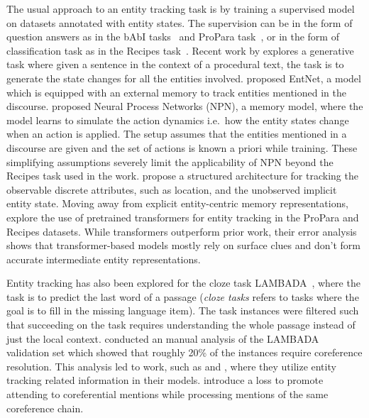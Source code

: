 \documentclass[12pt]{thesis-umich}[thesis]
\begin{document}
The usual approach to an entity tracking task is by training a supervised model on datasets annotated with entity states. The supervision can be in the form of question answers as in the bAbI tasks~\cite{weston2015aicomplete} and ProPara task~\cite{dalvi-etal-2018-tracking}, or in the form of classification task as in the Recipes task~\cite{kiddon-etal-2016-globally, bosselut-18}. 
Recent work by \citet{tandon-etal-2020-dataset} explores a generative task where given a sentence in the context of a procedural text, the task is to generate the state changes for all the entities involved. 
\citet{henaff2016tracking} proposed EntNet, a model which is equipped with an external memory to track entities mentioned in the discourse. 
\citet{bosselut-18} proposed Neural Process Networks (NPN), a memory model, where the model learns to simulate the action dynamics i.e.\ how the entity states change when an action is applied. The setup assumes that the entities mentioned in a discourse are given and the set of actions is known a priori while training. These simplifying assumptions severely limit the applicability of NPN beyond the Recipes task used in the work. \citet{gupta-durrett-2019-tracking} propose a structured architecture for tracking the observable discrete attributes, such as location, and the unobserved implicit entity state. Moving away from explicit entity-centric memory representations, \citet{gupta-durrett-2019-effective} explore the use of pretrained transformers for entity tracking in  the ProPara and Recipes datasets. While transformers outperform prior work, their error analysis shows that transformer-based models mostly rely on surface clues and don't form accurate intermediate entity representations.   

Entity tracking has also been explored for the cloze task LAMBADA~\cite{paperno-etal-2016-lambada}, where  the task is to predict the last word of a passage (\emph{cloze tasks} refers to tasks where the goal is to fill in the missing language item). The task instances were filtered such that succeeding on the task requires understanding the whole passage  instead of just the local context. 
\citet{chu-etal-2017-broad} conducted an manual analysis of the LAMBADA validation set which showed that roughly 20\% of the instances require coreference resolution. This analysis led to work, such as \citet{dhingra-etal-2018-neural} and \citet{hoang-etal-2018-entity}, where they utilize entity tracking related information in their models.  \citet{cheng2020entity} introduce a loss to promote attending to  coreferential mentions while processing mentions of the same coreference chain. 
\end{document}
